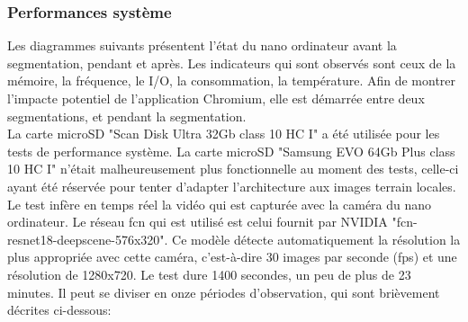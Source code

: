 \subsubsection{Performances système}
\noindent Les diagrammes suivants présentent l'état du nano ordinateur avant la segmentation, pendant et après. Les indicateurs qui sont observés sont ceux de la mémoire, la fréquence, le I/O, la consommation, la température. Afin de montrer l'impacte potentiel de l'application Chromium, elle est démarrée entre deux segmentations, et pendant la segmentation. 
\vspace{\baselineskip}
\\
\noindent La carte microSD "Scan Disk Ultra 32Gb class 10 HC I" a été utilisée pour les tests de performance système. La carte microSD "Samsung EVO 64Gb Plus class 10 HC I" n'était malheureusement plus fonctionnelle au moment des tests, celle-ci ayant été réservée pour tenter d'adapter l'architecture aux images terrain locales. 
\vspace{\baselineskip}
\\
\noindent Le test infère en temps réel la vidéo qui est capturée avec la caméra du nano ordinateur. Le réseau \acrshort{fcn} qui est utilisé est celui fournit par NVIDIA "fcn-resnet18-deepscene-576x320". Ce modèle détecte automatiquement la résolution la plus appropriée avec cette caméra, c'est-à-dire 30 images par seconde (\acrshort{fps}) et une résolution de 1280x720. Le test dure 1400 secondes, un peu de plus de 23 minutes. Il peut se diviser en onze périodes d'observation, qui sont brièvement décrites ci-dessous: 
